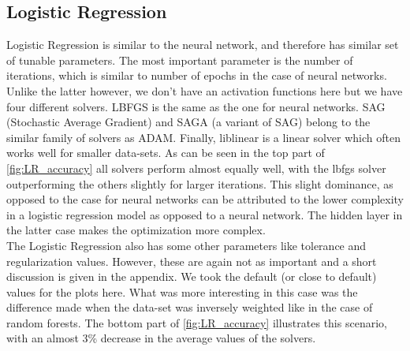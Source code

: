 \subsection{Logistic Regression}

Logistic Regression is similar to the neural network, and therefore has similar set of tunable parameters. The most important parameter is the number of iterations, which is similar to number of epochs in the case of neural networks. Unlike the latter however, we don't have an activation functions here but we have four different solvers. LBFGS is the same as the one for neural networks. SAG (Stochastic Average Gradient) and SAGA (a variant of SAG) belong to the similar family of solvers as ADAM. Finally, liblinear is a linear solver which often works well for smaller data-sets. As can be seen in the top part of \ref{fig:LR_accuracy} all solvers perform almost equally well, with the lbfgs solver outperforming the others slightly for larger iterations. This slight dominance, as opposed to the case for neural networks can be attributed to the lower complexity in a logistic regression model as opposed to a neural network. The hidden layer in the latter case makes the optimization more complex.\\

The Logistic Regression also has some other parameters like tolerance and regularization values. However, these are again not as important and a short discussion is given in the appendix. We took the default (or close to default) values for the plots here. What was more interesting in this case was the difference made when the data-set was inversely weighted like in the case of random forests. The bottom part of \ref{fig:LR_accuracy} illustrates this scenario, with an almost 3\% decrease in the average values of the solvers. \\




